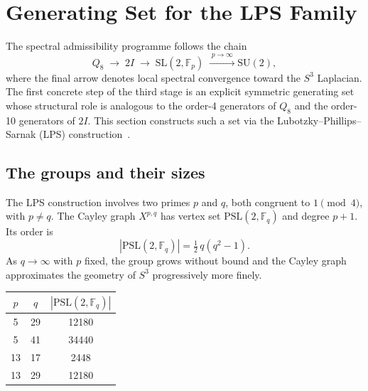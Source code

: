 \section{Generating Set for the LPS Family}
  \label{sec:step6a}

  The spectral admissibility programme follows the chain
  \begin{equation}
    Q_8
    \;\longrightarrow\;
    2I
    \;\longrightarrow\;
    \mathrm{SL}(2,\mathbb{F}_p)
    \;\xrightarrow{\;p \to \infty\;}
    \mathrm{SU}(2),
    \label{eq:chain-6a}
  \end{equation}
  where the final arrow denotes local spectral convergence toward the
  $S^3$ Laplacian.
  The first concrete step of the third stage is an explicit symmetric
  generating set whose structural role is analogous to the order-4
  generators of $Q_8$ and the order-10 generators of $2I$.
  This section constructs such a set via the Lubotzky--Phillips--Sarnak
  (LPS) construction~\cite{LPS1988}.

  \subsection{The groups and their sizes}
    \label{sec:step6a-group}

    The LPS construction involves two primes $p$ and $q$, both congruent to
    $1 \pmod{4}$, with $p \neq q$.
    The Cayley graph $X^{p,q}$ has vertex set $\mathrm{PSL}(2,\mathbb{F}_q)$
    and degree $p + 1$.
    Its order is
    \begin{equation}
      |\mathrm{PSL}(2,\mathbb{F}_q)| = \tfrac{1}{2}\,q(q^2-1).
      \label{eq:PSL2-order}
    \end{equation}
    As $q \to \infty$ with $p$ fixed, the group grows without bound and the
    Cayley graph approximates the geometry of $S^3$ progressively more finely.

    \medskip
    \begin{center}
      \renewcommand{\arraystretch}{1.2}
      \begin{tabular}{ccc}
        \hline
        $p$ & $q$ & $|\mathrm{PSL}(2,\mathbb{F}_q)|$ \\
        \hline
        5 & 29 & 12180 \\
        5 & 41 & 34440 \\
        13 & 17 & 2448  \\
        13 & 29 & 12180 \\
        \hline
      \end{tabular}
    \end{center}

